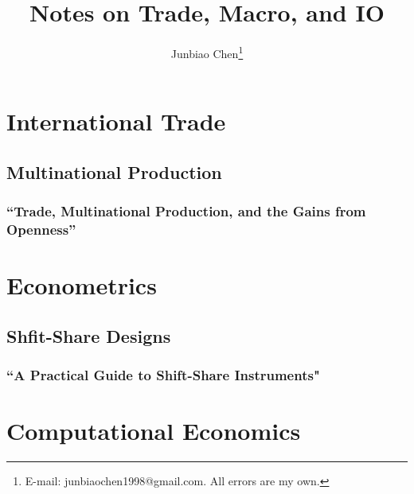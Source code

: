 \documentclass{report}
\title{Notes on Trade, Macro, and IO}
\author{
Junbiao Chen\thanks{E-mail: junbiaochen1998@gmail.com.
All errors are my own.}
}
\date{}
\theoremstyle{definition}
\numberwithin{equation}{section}
\numberwithin{figure}{section}
\numberwithin{table}{section}
\begin{document}
\maketitle

\renewcommand{\thechapter}{\Alph{chapter}}
\setcounter{tocdepth}{1}
\tableofcontents
\etocsettocstyle{}{} %

\chapter{International Trade}
\section{Multinational Production}


\subsection{``Trade, Multinational Production, and the Gains from Openness'' \\ \citep{Ramondo:2013}} 


\chapter{Econometrics}
\section{Shfit-Share Designs}
\subsection{``A Practical Guide to Shift-Share Instruments" \citep{Borusyak:2024}} 



\chapter{Computational Economics}



\end{document}
